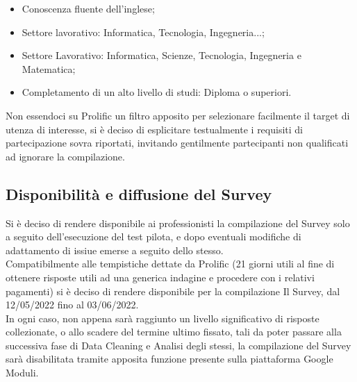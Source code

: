     \begin{itemize}
        \item Conoscenza fluente dell'inglese;
        \item Settore lavorativo: Informatica, Tecnologia, Ingegneria...;
        \item Settore Lavorativo: Informatica, Scienze, Tecnologia, Ingegneria e Matematica;
        \item Completamento di un alto livello di studi: Diploma o superiori.
    \end{itemize}
    
    Non essendoci su Prolific un filtro apposito per selezionare facilmente il target di utenza di interesse, si è deciso di esplicitare testualmente i requisiti di partecipazione sovra riportati, invitando gentilmente partecipanti non qualificati ad ignorare la compilazione. 
    
    
    \subsection{Disponibilità e diffusione del Survey}
    Si è deciso di rendere disponibile ai professionisti la compilazione del Survey solo a seguito dell'esecuzione del test pilota, e dopo eventuali modifiche di adattamento di issiue emerse a seguito dello stesso.\\ Compatibilmente alle tempistiche dettate da Prolific (21 giorni utili al fine di ottenere risposte utili ad una generica indagine e procedere con i relativi pagamenti) si è deciso di rendere disponibile per la compilazione Il Survey, dal 12/05/2022 fino al 03/06/2022.\\
    
    In ogni caso, non appena sarà raggiunto un livello significativo di risposte collezionate, o allo scadere del termine ultimo fissato, tali da poter passare alla successiva fase di Data Cleaning e Analisi degli stessi, la compilazione del Survey sarà disabilitata tramite apposita funzione presente sulla piattaforma Google Moduli.
    
